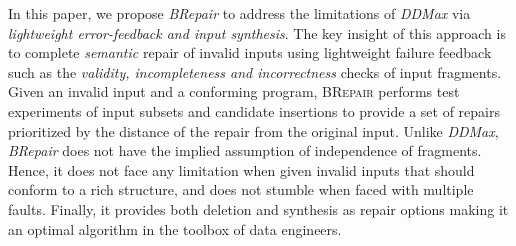 \documentclass[sigconf,review,anonymous]{acmart}
\newcounter{todocounter}
\newcommand{\todo}[1]{\marginpar{$|$}\textcolor{red}{\stepcounter{todocounter}\footnote[\thetodocounter]{\textcolor{red}{\textbf{TODO }}\textit{#1}}}}
\renewcommand{\todo}[1]{}
\newcommand{\approach}{\textsc{BRepair}\xspace}
\newcommand{\ddmax}{\textit{DDMax}\xspace}
\newcommand{\brepair}{\textit{BRepair}\xspace}
\begin{document}
In this paper, we propose \brepair to address the %
limitations of \ddmax via \textit{lightweight error-feedback and input synthesis}. The key insight of this approach is to complete \textit{semantic} repair of invalid inputs using lightweight failure feedback such as the \textit{validity, incompleteness and incorrectness} checks of input fragments. Given an invalid input and a conforming program, \approach performs test experiments of input subsets and candidate insertions to provide a set of repairs prioritized by the distance of the repair from the original input.
Unlike \ddmax, \brepair does not have the implied assumption of independence of
fragments. Hence, it does not face any limitation when given invalid inputs
that should conform to a rich structure, and %
does not stumble when faced
with multiple faults. Finally, it %
provides both deletion and
synthesis as repair options making it an optimal algorithm in the toolbox of
data engineers.

%
\end{document}
